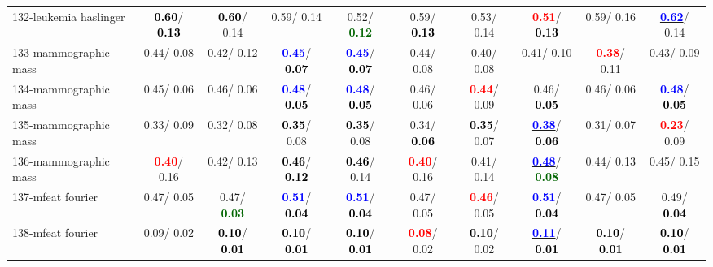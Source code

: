 \begin{table}[h]
\begin{center}
{\begin{tabular}{lc|c|c|c|c|c|c|c|c}
132-leukemia haslinger & \textcolor{black}{\textbf{  0.60}}/\textcolor{black}{\textbf{  0.13}} & \textcolor{black}{\textbf{  0.60}}/  0.14 &   0.59/  0.14 &   0.52/\textcolor{darkgreen}{\textbf{  0.12}} &   0.59/\textcolor{black}{\textbf{  0.13}} &   0.53/  0.14 & \textcolor{red}{\textbf{  0.51}}/\textcolor{black}{\textbf{  0.13}} &   0.59/  0.16 & \underline{\textcolor{blue}{\textbf{  0.62}}}/  0.14 \\
133-mammographic mass &   0.44/  0.08 &   0.42/  0.12 & \textcolor{blue}{\textbf{  0.45}}/\textcolor{black}{\textbf{  0.07}} & \textcolor{blue}{\textbf{  0.45}}/\textcolor{black}{\textbf{  0.07}} &   0.44/  0.08 &   0.40/  0.08 &   0.41/  0.10 & \textcolor{red}{\textbf{  0.38}}/  0.11 &   0.43/  0.09 \\
134-mammographic mass &   0.45/  0.06 &   0.46/  0.06 & \textcolor{blue}{\textbf{  0.48}}/\textcolor{black}{\textbf{  0.05}} & \textcolor{blue}{\textbf{  0.48}}/\textcolor{black}{\textbf{  0.05}} &   0.46/  0.06 & \textcolor{red}{\textbf{  0.44}}/  0.09 &   0.46/\textcolor{black}{\textbf{  0.05}} &   0.46/  0.06 & \textcolor{blue}{\textbf{  0.48}}/\textcolor{black}{\textbf{  0.05}} \\
135-mammographic mass &   0.33/  0.09 &   0.32/  0.08 & \textcolor{black}{\textbf{  0.35}}/  0.08 & \textcolor{black}{\textbf{  0.35}}/  0.08 &   0.34/\textcolor{black}{\textbf{  0.06}} & \textcolor{black}{\textbf{  0.35}}/  0.07 & \underline{\textcolor{blue}{\textbf{  0.38}}}/\textcolor{black}{\textbf{  0.06}} &   0.31/  0.07 & \textcolor{red}{\textbf{  0.23}}/  0.09 \\ \hline
136-mammographic mass & \textcolor{red}{\textbf{  0.40}}/  0.16 &   0.42/  0.13 & \textcolor{black}{\textbf{  0.46}}/\textcolor{black}{\textbf{  0.12}} & \textcolor{black}{\textbf{  0.46}}/  0.14 & \textcolor{red}{\textbf{  0.40}}/  0.16 &   0.41/  0.14 & \underline{\textcolor{blue}{\textbf{  0.48}}}/\textcolor{darkgreen}{\textbf{  0.08}} &   0.44/  0.13 &   0.45/  0.15 \\
137-mfeat fourier &   0.47/  0.05 &   0.47/\textcolor{darkgreen}{\textbf{  0.03}} & \textcolor{blue}{\textbf{  0.51}}/\textcolor{black}{\textbf{  0.04}} & \textcolor{blue}{\textbf{  0.51}}/\textcolor{black}{\textbf{  0.04}} &   0.47/  0.05 & \textcolor{red}{\textbf{  0.46}}/  0.05 & \textcolor{blue}{\textbf{  0.51}}/\textcolor{black}{\textbf{  0.04}} &   0.47/  0.05 &   0.49/\textcolor{black}{\textbf{  0.04}} \\
138-mfeat fourier &   0.09/  0.02 & \textcolor{black}{\textbf{  0.10}}/\textcolor{black}{\textbf{  0.01}} & \textcolor{black}{\textbf{  0.10}}/\textcolor{black}{\textbf{  0.01}} & \textcolor{black}{\textbf{  0.10}}/\textcolor{black}{\textbf{  0.01}} & \textcolor{red}{\textbf{  0.08}}/  0.02 & \textcolor{black}{\textbf{  0.10}}/  0.02 & \underline{\textcolor{blue}{\textbf{  0.11}}}/\textcolor{black}{\textbf{  0.01}} & \textcolor{black}{\textbf{  0.10}}/\textcolor{black}{\textbf{  0.01}} & \textcolor{black}{\textbf{  0.10}}/\textcolor{black}{\textbf{  0.01}} \\

\end{tabular}}
\end{center}
\end{table}
